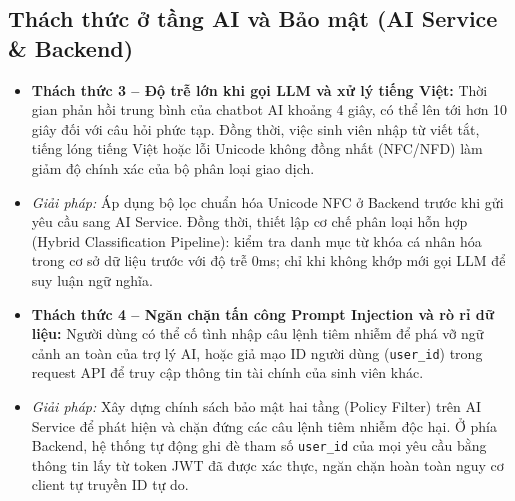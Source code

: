 \subsection{Thách thức ở tầng AI và Bảo mật (AI Service \& Backend)}
\begin{itemize}
    \item \textbf{Thách thức 3 -- Độ trễ lớn khi gọi LLM và xử lý tiếng Việt:} Thời gian phản hồi trung bình của chatbot AI khoảng 4 giây, có thể lên tới hơn 10 giây đối với câu hỏi phức tạp. Đồng thời, việc sinh viên nhập từ viết tắt, tiếng lóng tiếng Việt hoặc lỗi Unicode không đồng nhất (NFC/NFD) làm giảm độ chính xác của bộ phân loại giao dịch.
    \item \textit{Giải pháp:} Áp dụng bộ lọc chuẩn hóa Unicode NFC ở Backend trước khi gửi yêu cầu sang AI Service. Đồng thời, thiết lập cơ chế phân loại hỗn hợp (Hybrid Classification Pipeline): kiểm tra danh mục từ khóa cá nhân hóa trong cơ sở dữ liệu trước với độ trễ 0ms; chỉ khi không khớp mới gọi LLM để suy luận ngữ nghĩa.
    \item \textbf{Thách thức 4 -- Ngăn chặn tấn công Prompt Injection và rò rỉ dữ liệu:} Người dùng có thể cố tình nhập câu lệnh tiêm nhiễm để phá vỡ ngữ cảnh an toàn của trợ lý AI, hoặc giả mạo ID người dùng (\texttt{user\_id}) trong request API để truy cập thông tin tài chính của sinh viên khác.
    \item \textit{Giải pháp:} Xây dựng chính sách bảo mật hai tầng (Policy Filter) trên AI Service để phát hiện và chặn đứng các câu lệnh tiêm nhiễm độc hại. Ở phía Backend, hệ thống tự động ghi đè tham số \texttt{user\_id} của mọi yêu cầu bằng thông tin lấy từ token JWT đã được xác thực, ngăn chặn hoàn toàn nguy cơ client tự truyền ID tự do.
\end{itemize}

